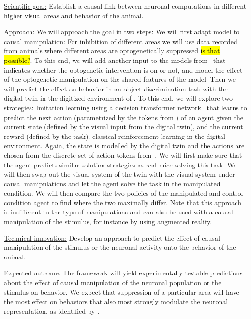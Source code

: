 \documentclass[COG,11pt]{ercgrant}
\begin{document}
\underline{Scientific goal:} Establish a causal link between neuronal computations in different higher visual areas and behavior of the animal. 

\underline{Approach:} 
We will approach the goal in two steps:  We will first adapt model to causal manipulation: For inhibition of different areas we will use data recorded from animals where different areas are optogenetically suppressed \hl{is that possible?}. 
To this end, we will add another input to the models from \obji~that indicates whether the optogenetic intervention is on or not, and model the effect of the optogenetic manipulation on the shared features of the model. 
Then we will predict the effect on behavior in an object discrimination task with the digital twin in the digitized environment of \obji. 
To this end, we will explore two strategies:  Imitation learning using a decision transformer network~\parencite{Chen2021-ap} that learns to predict the next action (parametrized by the tokens from \objii) of an agent given the current state (defined by the visual input from the digital twin), and the current reward (defined by the task).  classical reinforcement learning in the digital environment. Again, the state is modelled by the digital twin and the actions are chosen from the discrete set of action tokens from~\objii. 
We will first make sure that the agent predicts similar solution strategies as real mice solving this task.
We will then swap out the visual system of the twin with the visual system under causal manipulations and let the agent solve the task in the manipulated condition. 
We will then compare the two policies of the manipulated and control condition agent to find where the two maximally differ. 
Note that this approach is indifferent to the type of manipulations and can also be used with a causal manipulation of the stimulus, for instance by using augmented reality. 

\underline{Technical innovation:} Develop an approach to predict the effect of causal manipulation of the stimulus or the neuronal activity onto the behavior of the animal. 

\underline{Expected outcome:} 
The framework will yield experimentally testable predictions about the effect of causal manipulation of the neuronal population or the stimulus on behavior. 
We expect that suppression of a particular area will have the most effect on behaviors that also most strongly modulate the neuronal representation, as identified by \objii. 
\end{document}
